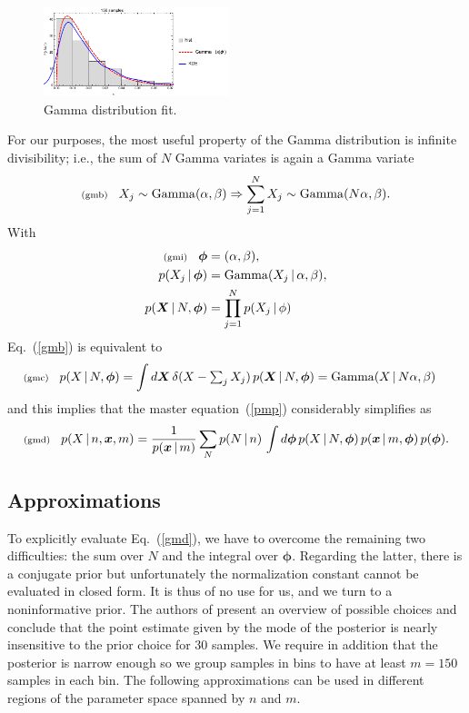 \documentclass[11pt]{article}
\newcommand{\fred}[1]{\todo[inline]{#1}} %
\newcommand{\lleq}[1]{\label{#1} }
\renewcommand{\lleq}[1]{\label{#1} {\scriptstyle {\rm (#1)}} \hspace*{2ex} }
\newcommand{\cond}{\,|\,}
\newcommand{\bmx}{{{\bm{x}}}}
\newcommand{\bmX}{{\bm{X}}}
\newcommand{\bmphi}{{\bm{\phi}}}
\DeclareMathOperator{\GammaDist}{Gamma}
\newcommand{\refeq}[1]{Eq.~(\ref{#1})}
\begin{document}
\begin{figure}[ht]
  \centering
  \includegraphics[width=0.48\textwidth]{gamma}
  \caption{Gamma distribution fit. }
  \label{fig:gamma}
\end{figure}

For our purposes, the most useful property of the Gamma
distribution is infinite divisibility; i.e., the sum of $N$ Gamma
variates is again a Gamma variate
\begin{align}
  \lleq{gmb}
  X_j \sim \GammaDist(\alpha, \beta) \Rightarrow \sum_{j=1}^N X_j \sim \GammaDist(N \alpha, \beta).
\end{align}
With
\begin{align}
  \lleq{gmi}
  \bmphi &= (\alpha, \beta),\\
  p(X_j \cond \bmphi) &=
  \GammaDist(X_j \cond \alpha, \beta),\\
  p(\bmX \cond N, \bmphi) &= \prod_{j=1}^N p(X_j \cond \phi)
\end{align}
 \refeq{gmb} is equivalent to
\begin{align}
  \lleq{gmc}
 p(X \cond N, \bmphi) &= \int d\bmX\,\delta(X - \textstyle\sum_j X_j)
  \,p(\bmX\cond N,\bmphi) = \GammaDist(X \cond N \alpha, \beta)
\end{align}
and this implies that the master equation~(\ref{pmp}) considerably simplifies as
\begin{align}
  \lleq{gmd}
    p(X\cond n,\bmx,m)
  = \frac{1}{p(\bmx\cond m)}
  \sum_N p(N\cond n)\, \int d\bmphi\, p(X \cond N, \bmphi)\, p(\bmx\cond m,\bmphi)
  \, p(\bmphi).
\end{align}

\subsection*{Approximations}

To explicitly evaluate \refeq{gmd}, we have to overcome the remaining
two difficulties: the sum over $N$ and the integral over
$\bmphi$. Regarding the latter, there is a conjugate prior but
unfortunately the normalization constant cannot be evaluated in closed
form. It is thus of no use for us, and we turn to a noninformative
prior. \fred{Be explicit about prior choice} The authors of
\cite{moala2013bayesian} present an overview of possible choices and
conclude that the point estimate given by the mode of the posterior is
nearly insensitive to the prior choice for 30 samples. We require in
addition that the posterior is narrow enough so we group samples in
bins to have at least $m=150$ samples in each bin. The following
approximations can be used in different regions of the parameter space
spanned by $n$ and $m$.
\end{document}
